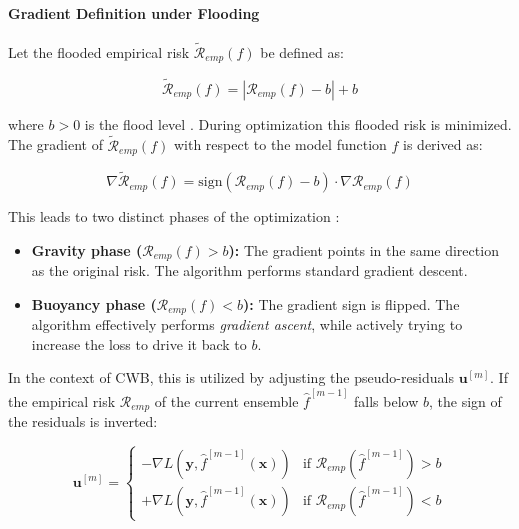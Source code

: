 \documentclass[fontsize=12 pt]{scrartcl}
\begin{document}
\paragraph{Gradient Definition under Flooding}

Let the flooded empirical risk $\tilde{\mathcal{R}}_{emp}(f)$ be defined as:

\begin{equation}
    \tilde{\mathcal{R}}_{emp}(f) = |\mathcal{R}_{emp}(f) - b| + b
\end{equation}

where $b > 0$ is the flood level \citep{ishida2020need}. During optimization this flooded risk is minimized. The gradient of $\tilde{\mathcal{R}}_{emp}(f)$ with respect to the model function $f$ is derived as:

\begin{equation}
    \nabla \tilde{\mathcal{R}}_{emp}(f) = \text{sign}(\mathcal{R}_{emp}(f) - b) \cdot \nabla \mathcal{R}_{emp}(f)
\end{equation}

This leads to two distinct phases of the optimization \citep{ishida2020need}:
\begin{itemize}
    \item \textbf{Gravity phase ($\mathcal{R}_{emp}(f) > b$):} The gradient points in the same direction as the original risk. The algorithm performs standard gradient descent.
    \item \textbf{Buoyancy phase ($\mathcal{R}_{emp}(f) < b$):} The gradient sign is flipped. The algorithm effectively performs \textit{gradient ascent}, while actively trying to increase the loss to drive it back to $b$.
\end{itemize}

In the context of CWB, this is utilized by adjusting the pseudo-residuals $\mathbf{u}^{[m]}$. If the empirical risk $\mathcal{R}_{emp}$ of the current ensemble $\hat{f}^{[m-1]}$ falls below $b$, the sign of the residuals is inverted:

\begin{equation}
    \mathbf{u}^{[m]} = \begin{cases} 
    -\nabla L(\mathbf{y}, \hat{f}^{[m-1]}(\mathbf{x})) & \text{if } \mathcal{R}_{emp}(\hat{f}^{[m-1]}) > b \\
    +\nabla L(\mathbf{y}, \hat{f}^{[m-1]}(\mathbf{x})) & \text{if } \mathcal{R}_{emp}(\hat{f}^{[m-1]}) < b 
    \end{cases}
\end{equation}
\end{document}
